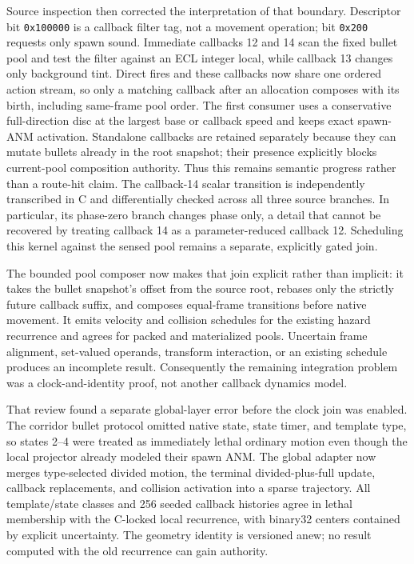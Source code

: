 \documentclass[10pt]{article}
\begin{document}
Source inspection then corrected the interpretation of that boundary.
Descriptor bit \texttt{0x100000} is a callback filter tag, not a movement
operation; bit \texttt{0x200} requests only spawn sound.  Immediate callbacks
12 and 14 scan the fixed bullet pool and test the filter against an ECL integer
local, while callback 13 changes only background tint.  Direct fires and these
callbacks now share one ordered action stream, so only a matching callback
after an allocation composes with its birth, including same-frame pool order.
The first consumer uses a conservative full-direction disc at the largest
base or callback speed and keeps exact spawn-ANM activation.  Standalone
callbacks are retained separately because they can mutate bullets already in
the root snapshot; their presence explicitly blocks current-pool composition
authority.  Thus this remains semantic progress rather than a route-hit claim.
The callback-14 scalar transition is independently transcribed in C and
differentially checked across all three source branches.  In particular, its
phase-zero branch changes phase only, a detail that cannot be recovered by
treating callback 14 as a parameter-reduced callback 12.  Scheduling this
kernel against the sensed pool remains a separate, explicitly gated join.

The bounded pool composer now makes that join explicit rather than implicit:
it takes the bullet snapshot's offset from the source root, rebases only the
strictly future callback suffix, and composes equal-frame transitions before
native movement.  It emits velocity and collision schedules for the existing
hazard recurrence and agrees for packed and materialized pools.  Uncertain
frame alignment, set-valued operands, transform interaction, or an existing
schedule produces an incomplete result.  Consequently the remaining
integration problem was a clock-and-identity proof, not another callback
dynamics model.

That review found a separate global-layer error before the clock join was
enabled.  The corridor bullet protocol omitted native state, state timer, and
template type, so states 2--4 were treated as immediately lethal ordinary
motion even though the local projector already modeled their spawn ANM.  The
global adapter now merges type-selected divided motion, the terminal
divided-plus-full update, callback replacements, and collision activation into
a sparse trajectory.  All template/state classes and 256 seeded callback
histories agree in lethal membership with the C-locked local recurrence, with
binary32 centers contained by explicit uncertainty.  The geometry identity is
versioned anew; no result computed with the old recurrence can gain authority.
\end{document}
